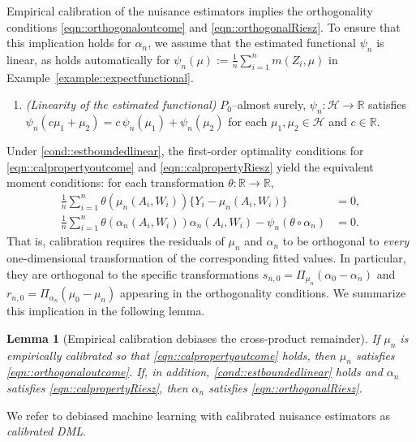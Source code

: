 \documentclass[11pt]{article}
\theoremstyle{plain}
\newtheorem{lemma}{Lemma}
\begin{document}
 



 
Empirical calibration of the nuisance estimators implies the orthogonality
conditions \eqref{eqn::orthogonaloutcome} and \eqref{eqn::orthogonalRiesz}. To
ensure that this implication holds for \(\alpha_n\), we assume that the
estimated functional \(\psi_n\) is linear, as holds automatically for
\(\psi_n(\mu) := \frac{1}{n}\sum_{i=1}^n m(Z_i,\mu)\) in
Example~\ref{example::expectfunctional}.
\begin{enumerate}[label=\bf{B\arabic*)}, ref={B\arabic*},resume=sketch]
 \item \textit{(Linearity of the estimated functional)}
 \label{cond::estboundedlinear}
 \(P_0\)--almost surely, $\psi_n:\mathcal{H} \rightarrow \mathbb{R}$ satisfies \(\psi_n(c\mu_1 + \mu_2) = c\,\psi_n(\mu_1) + \psi_n(\mu_2)\)
 for each \(\mu_1,\mu_2\in \mathcal{H}\) and \(c\in\mathbb{R}\).
\end{enumerate}
 Under \ref{cond::estboundedlinear}, the first-order optimality conditions for
\eqref{eqn::calpropertyoutcome} and \eqref{eqn::calpropertyRiesz} yield the
equivalent moment conditions: for each transformation
\(\theta:\mathbb{R}\to\mathbb{R}\),
\begin{align}
    \frac{1}{n}\sum_{i=1}^n \theta\left(\mu_n(A_i,W_i)\right)\{Y_i - \mu_n(A_i,W_i)\}
    &= 0, \label{eqn::calpropertyoutcome2}\\
    \frac{1}{n}\sum_{i=1}^n \theta\left(\alpha_n(A_i,W_i)\right)\alpha_n(A_i,W_i)
    - \psi_n(\theta \circ \alpha_n)
    &= 0. \label{eqn::calpropertyRiesz2}
\end{align}
That is, calibration requires the residuals of \(\mu_n\) and \(\alpha_n\) to be
orthogonal to \emph{every} one-dimensional transformation of the corresponding
fitted values. In particular, they are orthogonal to the specific
transformations \(s_{n,0}=\Pi_{\mu_n}(\alpha_0 - \alpha_n)\) and
\(r_{n,0}=\Pi_{\alpha_n}(\mu_0 - \mu_n)\) appearing in the orthogonality conditions. We summarize this implication in the
following lemma.


\begin{lemma}[Empirical calibration debiases the cross-product remainder]
\label{theorem:empiricalcalibration}
If $\mu_n$ is empirically calibrated so that \eqref{eqn::calpropertyoutcome}
holds, then $\mu_n$ satisfies \eqref{eqn::orthogonaloutcome}. If, in addition, \ref{cond::estboundedlinear} holds and $\alpha_n$ satisfies
\eqref{eqn::calpropertyRiesz}, then $\alpha_n$ satisfies
\eqref{eqn::orthogonalRiesz}.
\end{lemma}
\noindent We refer to debiased machine learning with calibrated nuisance estimators as
\emph{calibrated DML}. 
\end{document}
